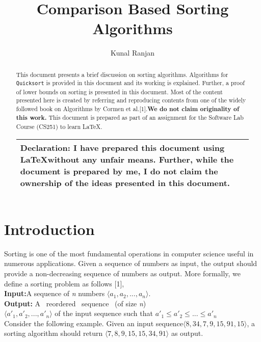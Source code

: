 \documentclass[a4paper, 10pt,twocolumn]{article}
\title{Comparison Based Sorting Algorithms}
\author{Kunal Ranjan}
\date{}
\begin{document}
\maketitle
\begin{abstract}
This document presents a brief discussion on sorting algorithms. Algorithms for \texttt{Quicksort} is provided in this document and its working is explained. Further, a proof of lower bounds on sorting is presented in this document. Most of the content presented here is created by referring and reproducing contents from one of the widely followed book on Algorithms by Cormen et al.[1].\textbf{We do not claim originality of this work.} This document is prepared as part of an assignment for the Software Lab
Course (CS251) to learn \LaTeX. \\
\begin{tabular}{|p{7.2 cm}|}
\hline     
 Declaration: I have prepared this document using \LaTeX without any unfair means. Further, while the document is prepared by me, I do not claim the ownership of the ideas presented in this document. \\
\hline     
\end{tabular}
\end{abstract}    
\section{Introduction}
Sorting is one of the most fundamental operations in computer science useful in numerous applications. Given a sequence of numbers as input, the output should provide a non-decreasing sequence of numbers as output. More formally, we define a sorting problem as follows [1], \\
\textbf{Input:}A sequence of \textit{n} numbers $\langle a_{1},a_{2},...,a_{n} \rangle$. \\
\textbf{Output:}\hspace{1 cm} A \ reordered  \ sequence \ (of size \textit{n}) \\ 
$\langle a'_{1},a'_{2},...,a'_{n} \rangle$ of the input sequence such that $a'_{1}\leq a'_{2}\leq ...\leq a'_{n}$ \\
Consider the following example. Given an input sequence$\langle8, 34, 7, 9, 15, 91, 15\rangle$, a sorting algorithm should return $\langle7, 8, 9, 15, 15, 34, 91\rangle$ as output. 
\end{document}
